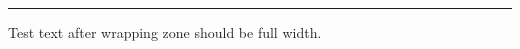 \documentclass[11pt,a4paper]{article}
\begin{document}
\begin{swarmwrap}%
  \begin{minipage}[t]{3cm}
    \centering
    \textcolor{red!20}{\rule{\linewidth}{3cm}}
  \end{minipage}%
\end{swarmwrap}%
\swarmwrapnext
\lipsum[1-6]  %

Test text after wrapping zone should be full width.
\end{document}
